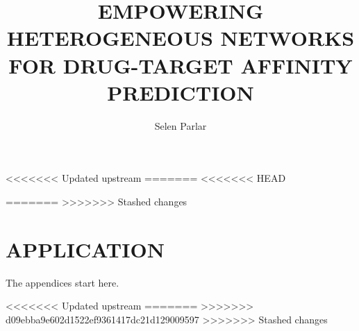 \documentclass[a4paper,onesided,12pt]{report}
\title{EMPOWERING HETEROGENEOUS NETWORKS FOR DRUG-TARGET AFFINITY PREDICTION}
\author{Selen Parlar}
\begin{document}
\makemstitle 
\makeapprovalpage





\tableofcontents
\listoffigures
\listoftables











\appendix
<<<<<<< Updated upstream
=======
<<<<<<< HEAD

=======
>>>>>>> Stashed changes

\chapter{APPLICATION}
The appendices start here.

<<<<<<< Updated upstream
=======
>>>>>>> d09ebba9e602d1522ef9361417dc21d129009597
>>>>>>> Stashed changes
\end{document}
